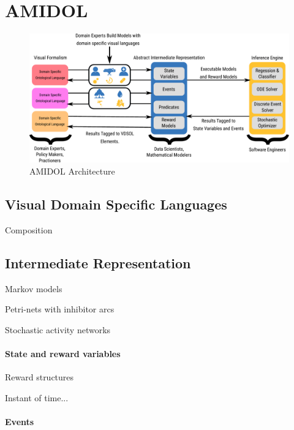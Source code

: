 \documentclass[11pt]{article}
\begin{document}
\section{AMIDOL}

\begin{figure}
  \includegraphics[width=\textwidth]{figs/system-architecture-quad.pdf}
  \caption{AMIDOL Architecture}
\end{figure}

\subsection{Visual Domain Specific Languages}

Composition \cite{sanders1992dependability,sanders1988construction}

\subsection{Intermediate Representation}

Markov models \cite{howard2012dynamic}

Petri-nets with inhibitor arcs \cite{chiola1993generalized}

Stochastic activity networks \cite{movaghar1985performability,sanders2000stochastic}

\paragraph{State and reward variables}

Reward structures \cite{qureshi1996algorithms,deavours1999efficient,ciardo1996well,sanders1991reduced}

Instant of time... \cite{freire1990technique}

\paragraph{Events}
\end{document}
